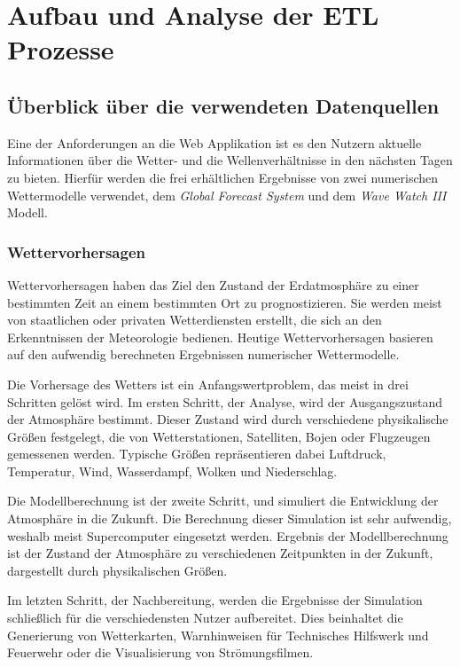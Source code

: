 
\chapter{Aufbau und Analyse der ETL Prozesse}

\section{Überblick über die verwendeten Datenquellen}

Eine der Anforderungen an die Web Applikation ist es den Nutzern
aktuelle Informationen über die Wetter- und die Wellenverhältnisse in
den nächsten Tagen zu bieten. Hierfür werden die frei erhältlichen
Ergebnisse von zwei numerischen Wettermodelle verwendet, dem
\textit{Global Forecast System} und dem \textit{Wave Watch III}
Modell.

\subsection{Wettervorhersagen}

Wettervorhersagen haben das Ziel den Zustand der Erdatmosphäre zu
einer bestimmten Zeit an einem bestimmten Ort zu prognostizieren. Sie
werden meist von staatlichen oder privaten Wetterdiensten erstellt,
die sich an den Erkenntnissen der Meteorologie bedienen. Heutige
Wettervorhersagen basieren auf den aufwendig berechneten Ergebnissen
numerischer Wettermodelle.

Die Vorhersage des Wetters ist ein Anfangswertproblem, das meist in
drei Schritten gelöst wird. Im ersten Schritt, der Analyse, wird der
Ausgangszustand der Atmosphäre bestimmt. Dieser Zustand wird durch
verschiedene physikalische Größen festgelegt, die von Wetterstationen,
Satelliten, Bojen oder Flugzeugen gemessenen werden. Typische Größen
repräsentieren dabei Luftdruck, Temperatur, Wind, Wasserdampf, Wolken
und Niederschlag.

Die Modellberechnung ist der zweite Schritt, und simuliert die
Entwicklung der Atmosphäre in die Zukunft. Die Berechnung dieser
Simulation ist sehr aufwendig, weshalb meist Supercomputer eingesetzt
werden. Ergebnis der Modellberechnung ist der Zustand der Atmosphäre
zu verschiedenen Zeitpunkten in der Zukunft, dargestellt durch
physikalischen Größen.

Im letzten Schritt, der Nachbereitung, werden die Ergebnisse der
Simulation schließlich für die verschiedensten Nutzer
aufbereitet. Dies beinhaltet die Generierung von Wetterkarten,
Warnhinweisen für Technisches Hilfswerk und Feuerwehr oder die
Visualisierung von Strömungsfilmen.

